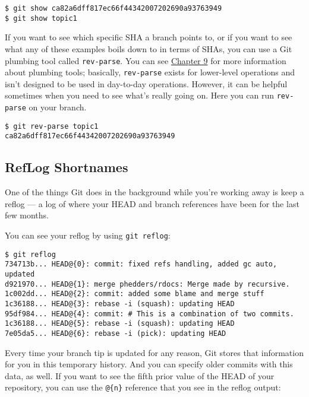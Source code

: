 \documentclass[a4paper]{book}
\newcommand{\prechap}{Chapter }
\newcommand{\postchap}{}
\newcommand{\chapref}[1]{\hyperref[chap:#1]{\prechap #1\postchap}}
\begin{document}
\begin{shaded}\begin{verbatim}
$ git show ca82a6dff817ec66f44342007202690a93763949
$ git show topic1
\end{verbatim}\end{shaded}

If you want to see which specific SHA a branch points to, or if you want to see what any of these examples boils down to in terms of SHAs, you can use a Git plumbing tool called \texttt{rev-parse}. You can see \chapref{9} for more information about plumbing tools; basically, \texttt{rev-parse} exists for lower-level operations and isn't designed to be used in day-to-day operations. However, it can be helpful sometimes when you need to see what's really going on. Here you can run \texttt{rev-parse} on your branch.

\begin{shaded}\begin{verbatim}
$ git rev-parse topic1
ca82a6dff817ec66f44342007202690a93763949
\end{verbatim}\end{shaded}

\subsection{RefLog Shortnames}\label{reflog-shortnames}

One of the things Git does in the background while you're working away is keep a reflog --- a log of where your HEAD and branch references have been for the last few months.

You can see your reflog by using \texttt{git reflog}:

\begin{shaded}\begin{verbatim}
$ git reflog
734713b... HEAD@{0}: commit: fixed refs handling, added gc auto, updated
d921970... HEAD@{1}: merge phedders/rdocs: Merge made by recursive.
1c002dd... HEAD@{2}: commit: added some blame and merge stuff
1c36188... HEAD@{3}: rebase -i (squash): updating HEAD
95df984... HEAD@{4}: commit: # This is a combination of two commits.
1c36188... HEAD@{5}: rebase -i (squash): updating HEAD
7e05da5... HEAD@{6}: rebase -i (pick): updating HEAD
\end{verbatim}\end{shaded}

Every time your branch tip is updated for any reason, Git stores that information for you in this temporary history. And you can specify older commits with this data, as well. If you want to see the fifth prior value of the HEAD of your repository, you can use the \texttt{@\{n\}} reference that you see in the reflog output:
\end{document}
